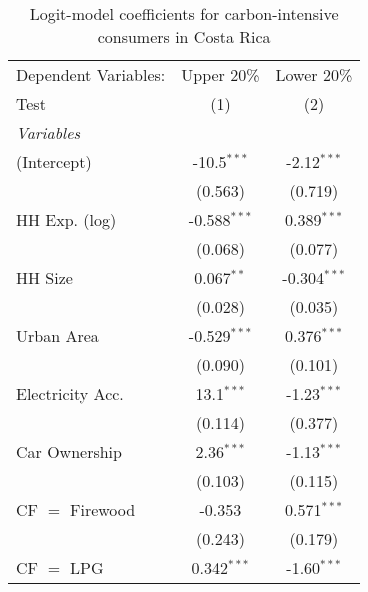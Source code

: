 
\begin{table}[htbp!]
   \centering
   \small
   \begin{adjustbox}{width = 1\textwidth, max height = 0.95\textheight, center}
      \begin{threeparttable}[b]
         \caption{\label{tab:Logit_1_CRI} Logit-model coefficients for carbon-intensive consumers in Costa Rica}
         \begin{tabular}{lcc}
            \tabularnewline \midrule \midrule
            Dependent Variables:           & Upper 20\%     & Lower 20\%\\   
            Test                           & (1)            & (2)\\  
            \midrule
            \emph{Variables}\\
            (Intercept)                    & -10.5$^{***}$  & -2.12$^{***}$\\   
                                           & (0.563)        & (0.719)\\   
            HH Exp. (log)                  & -0.588$^{***}$ & 0.389$^{***}$\\   
                                           & (0.068)        & (0.077)\\   
            HH Size                        & 0.067$^{**}$   & -0.304$^{***}$\\   
                                           & (0.028)        & (0.035)\\   
            Urban Area                     & -0.529$^{***}$ & 0.376$^{***}$\\   
                                           & (0.090)        & (0.101)\\   
            Electricity Acc.               & 13.1$^{***}$   & -1.23$^{***}$\\   
                                           & (0.114)        & (0.377)\\   
            Car Ownership                  & 2.36$^{***}$   & -1.13$^{***}$\\   
                                           & (0.103)        & (0.115)\\   
            CF $=$ Firewood                & -0.353         & 0.571$^{***}$\\   
                                           & (0.243)        & (0.179)\\   
            CF $=$ LPG                     & 0.342$^{***}$  & -1.60$^{***}$\\   

\end{tabular}
\end{threeparttable}
\end{adjustbox}
\end{table}
